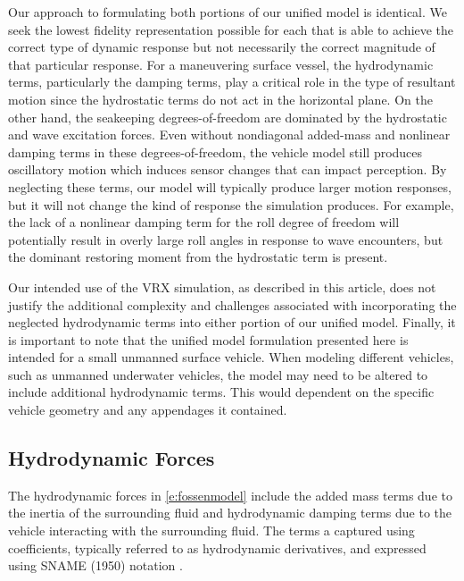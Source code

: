 \documentclass[utf8]{frontiersSCNS} %
\begin{document}
Our approach to formulating both portions of our unified model is identical. We seek the lowest fidelity representation possible for each that is able to achieve the correct type of dynamic response but not necessarily the correct magnitude of that particular response. For a maneuvering surface vessel, the hydrodynamic terms, particularly the damping terms, play a critical role in the type of resultant motion \color{red} since the hydrostatic terms do not act in the horizontal plane. On the other hand, the seakeeping degrees-of-freedom are dominated by the hydrostatic and wave excitation forces. Even without nondiagonal added-mass and nonlinear damping terms in these degrees-of-freedom, the vehicle model still produces oscillatory motion which induces sensor changes that can impact perception. By neglecting these terms, our model will typically produce larger motion responses, but it will not change the kind of response the simulation produces. For example, the lack of a nonlinear damping term for the roll degree of freedom will potentially result in overly large roll angles in response to wave encounters, but the dominant restoring moment from the hydrostatic term is present.\color{black}

Our intended use of the VRX simulation, as described in this article, does not justify the additional complexity and challenges associated with incorporating the neglected hydrodynamic terms into either portion of our unified model. Finally, it is important to note that the unified model formulation presented here is intended for a small unmanned surface vehicle. When modeling different vehicles, such as unmanned underwater vehicles, the model may need to be altered to include additional hydrodynamic terms. This would dependent on the specific vehicle geometry and any appendages it contained.%
%
\subsection{Hydrodynamic Forces}\label{s:hydro}
%
The hydrodynamic forces in \eqref{e:fossenmodel} include the added mass terms due to the inertia of the surrounding fluid and hydrodynamic damping terms due to the vehicle interacting with the surrounding fluid. The terms a captured using coefficients, typically referred to as hydrodynamic derivatives, and expressed using SNAME (1950) notation \citep{fossen11handbook}.
\end{document}
